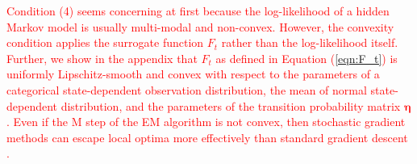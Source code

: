 \textcolor{red}{Condition (4) seems concerning at first because the log-likelihood of a hidden Markov model is usually multi-modal and non-convex. However, the convexity condition applies the surrogate function $F_t$ rather than the log-likelihood itself. Further, we show in the appendix that $F_t$ as defined in Equation (\ref{eqn:F_t}) is uniformly Lipschitz-smooth and convex with respect to the parameters of a categorical state-dependent observation distribution, the mean of normal state-dependent distribution, and the parameters of the transition probability matrix $\mathbf{\eta}$. Even if the M step of the EM algorithm is not convex, then stochastic gradient methods can escape local optima more effectively than standard gradient descent \citep{Kleinberg:2018}.} %





